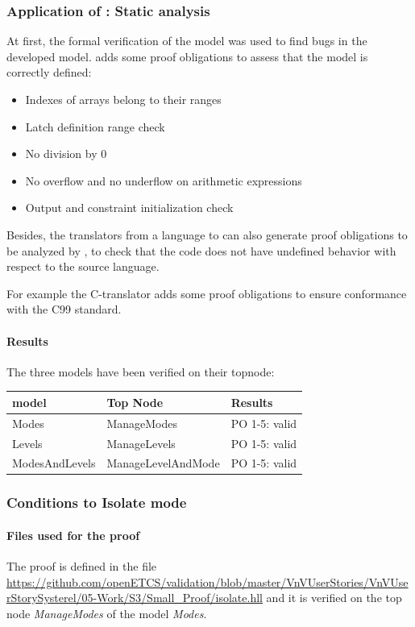\subsubsection{Application of \smartsolver{}: Static analysis}
\label{sec:static-analysis}

At first, the formal verification of the model was used to find bugs in the developed
\SCADE{} model.
\smartsolver{} adds some proof obligations to assess that the \HLL{}
model is correctly defined:
\begin{itemize}
\item Indexes of arrays belong to their ranges
\item Latch definition range check
\item No division by 0
\item No overflow and no underflow on arithmetic expressions
\item Output and constraint initialization check
\end{itemize}

Besides, the translators from a language to \HLL{} can also generate proof obligations to be analyzed by \smartsolver{},
to check that the code does not have undefined behavior with respect to the source language.

For example the C-translator adds some proof obligations to ensure conformance with the C99 standard.


\paragraph{Results}
The three models have been verified on their topnode:

\begin{tabular}{|l|l|l|}
\hline
\textbf{\SCADE{} model} & \textbf{Top Node} & \textbf{Results}  \\ \hline
Modes & ManageModes &  PO 1-5: valid \\
Levels & ManageLevels &  PO 1-5: valid \\
ModesAndLevels & ManageLevelAndMode & PO 1-5: valid \\
\hline
\end{tabular}

\subsubsection{Conditions to Isolate mode}
\label{sec:isolate}

\paragraph{Files used for the proof} The proof is defined in the file \url{https://github.com/openETCS/validation/blob/master/VnVUserStories/VnVUserStorySysterel/05-Work/S3/Small_Proof/isolate.hll} and it is verified on the top node \emph{ManageModes} of the \SCADE{} model \emph{Modes}.


